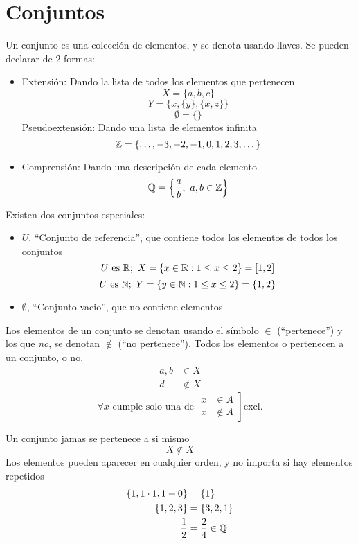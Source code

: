 \documentclass[../teoria.root.tex]{subfiles}
\begin{document}
\section{Conjuntos}
Un conjunto es una colección de elementos, y se denota usando llaves.
Se pueden declarar de 2 formas:
\begin{itemize}
    \item Extensión: Dando la lista de todos los elementos que pertenecen
          \[ X = \{a, b, c \} \]
          \[ Y = \{ x, \{y\}, \{x,z\} \} \]
          \[ \emptyset = \{\} \]
          \subitem Pseudoextensión: Dando una lista de elementos infinita
          \[ \mathbb{Z} = \{ \dots,-3,-2,-1,0,1,2,3,\dots \} \]
    \item Comprensión: Dando una descripción de cada elemento
          \[ \mathbb{Q} = \left\{\frac{a}{b},\ a,b \in \mathbb{Z} \right\}\]
\end{itemize}

Existen dos conjuntos especiales:
\begin{itemize}
    \item $U$, ``Conjunto de referencia'', que contiene todos los elementos de todos los conjuntos
          \[ \text{$U$ es $\mathbb{R}$};\ X = \{ x \in \mathbb{R}: 1 \leq x \leq 2 \} = [ 1, 2 ] \]
          \[ \text{$U$ es $\mathbb{N}$};\ Y = \{ y \in \mathbb{N}: 1 \leq x \leq 2 \} = \{ 1, 2\} \]
    \item $\emptyset$, ``Conjunto vacio'', que no contiene elementos
\end{itemize}

Los elementos de un conjunto se denotan usando el símbolo $\in$ (``pertenece'')
y los que \textit{no}, se denotan $\notin$ (``no pertenece'').
Todos los elementos o pertenecen a un conjunto, o no.
\begin{align*}
    a,b & \in X    \\
    d   & \notin X
\end{align*}
\[
    \forall x
    \text{ cumple solo una de }
    \left.
    \begin{array}{rl}
        x & \in A    \\
        x & \notin A
    \end{array}
    \right]
    \text{excl.}
\]

Un conjunto jamas se pertenece a si mismo
\[ X \notin X \]
Los elementos pueden aparecer en cualquier orden, y no importa si hay elementos repetidos
\begin{align*}
    \{ 1, 1\cdot1, 1+0 \} & = \{ 1 \}            \\
    \{ 1, 2, 3 \}         & = \{ 3, 2, 1 \}      \\
    \frac{1}{2}           & = \frac{2}{4} \in \mathbb{Q}
\end{align*}
\end{document}
